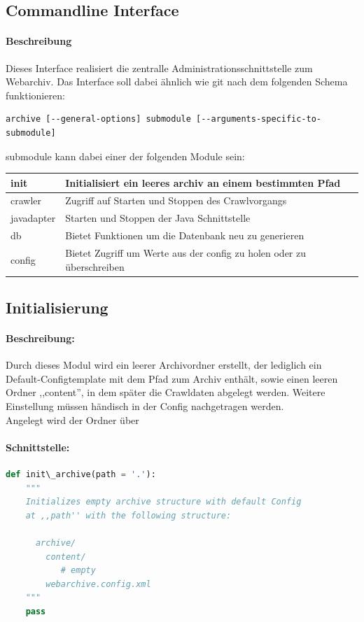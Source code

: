 \subsection{Commandline Interface}
\label{sub:commandline_interface}
\paragraph{Beschreibung}
\label{par:beschreibung}
Dieses Interface realisiert die zentralle Administrationsschnittstelle zum Webarchiv. 
Das Interface soll dabei ähnlich wie git nach dem folgenden Schema funktionieren:
\begin{verbatim}
archive [--general-options] submodule [--arguments-specific-to-submodule]
\end{verbatim}
submodule kann dabei einer der folgenden Module sein:
\begin{table}[h]
\centering
\begin{tabular}{|l|l|}
    \hline
init & Initialisiert ein leeres archiv an einem bestimmten Pfad \\
    \hline
crawler & Zugriff auf Starten und Stoppen des Crawlvorgangs \\
    \hline
javadapter & Starten und Stoppen der Java Schnittstelle \\
    \hline
db & Bietet Funktionen um die Datenbank neu zu generieren \\
    \hline
config & Bietet Zugriff um Werte aus der config zu holen oder zu überschreiben \\
    \hline
\end{tabular}
\end{table}

\subsection{Initialisierung} 
\label{sub:initialisierung}
\paragraph{Beschreibung:}
\label{par:beschreibung}
Durch dieses Modul wird ein leerer Archivordner erstellt, der lediglich
ein Default-Configtemplate mit dem Pfad zum Archiv enthält, sowie einen leeren Ordner ,,content'',
in dem später die Crawldaten abgelegt werden.
Weitere Einstellung müssen händisch in der Config nachgetragen werden.
\\
Angelegt wird der Ordner über %
\paragraph{Schnittstelle:}
\label{par:schnittstelle}
\begin{lstlisting}[language=python]
def init\_archive(path = '.'):
    """
    Initializes empty archive structure with default Config
    at ,,path'' with the following structure:

      archive/
        content/ 
           # empty
        webarchive.config.xml
    """
    pass
\end{lstlisting}


